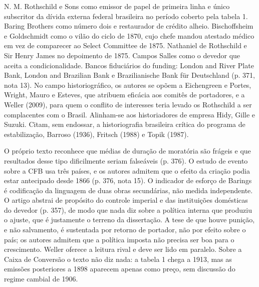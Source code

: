 N. M. Rothschild e Sons como emissor de papel de primeira linha e único
subscritor da dívida externa federal brasileira no período coberto pela tabela
1. Baring Brothers como número dois e restaurador de crédito alheio.
Bischoffsheim e Goldschmidt como o vilão do ciclo de 1870, cujo chefe mandou
atestado médico em vez de comparecer ao Select Committee de 1875. Nathaniel de
Rothschild e Sir Henry James no depoimento de 1875. Campos Salles como o devedor
que aceita a condicionalidade. Bancos fiduciários do funding: London and River
Plate Bank, London and Brazilian Bank e Brazilianische Bank für Deutschland
(p. 371, nota 13). No campo historiográfico, os autores se opõem a Eichengreen e
Portes, Wright, Mauro e Esteves, que atribuem eficácia aos comitês de
portadores, e a Weller (2009), para quem o conflito de interesses teria levado
os Rothschild a ser complacentes com o Brasil. Alinham-se aos historiadores de
empresa Hidy, Gille e Suzuki. Citam, sem endossar, a historiografia brasileira
crítica do programa de estabilização, Barroso (1936), Fritsch (1988) e Topik
(1987).

O próprio texto reconhece que médias de duração de moratória são frágeis e que
resultados desse tipo dificilmente seriam falseáveis (p. 376). O estudo de
evento sobre a CFB usa três países, e os autores admitem que o efeito da criação
podia estar antecipado desde 1866 (p. 376, nota 15). O indicador de esforço de
Barings é codificação da linguagem de duas obras secundárias, não medida
independente. O artigo abstrai de propósito do controle imperial e das
instituições domésticas do devedor (p. 357), de modo que nada diz sobre a
política interna que produziu o ajuste, que é justamente o terreno da
dissertação. A tese de que houve punição, e não salvamento, é sustentada por
retorno de portador, não por efeito sobre o país; os autores admitem que a
política imposta não precisa ser boa para o crescimento. Weller oferece a
leitura rival e deve ser lido em paralelo. Sobre a Caixa de Conversão o texto
não diz nada: a tabela 1 chega a 1913, mas as emissões posteriores a 1898
aparecem apenas como preço, sem discussão do regime cambial de 1906.

